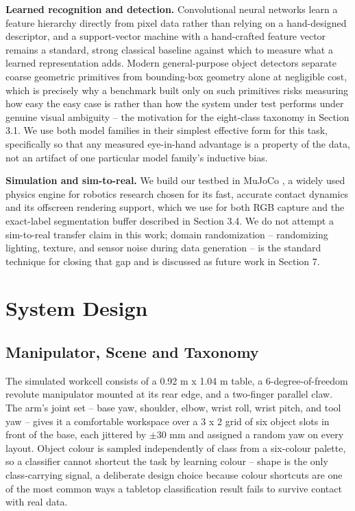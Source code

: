 \documentclass[conference]{IEEEtran}
\begin{document}
\textbf{Learned recognition and detection.} Convolutional neural networks \cite{lecun1998gradient} learn a feature hierarchy directly from pixel data rather than relying on a hand-designed descriptor, and a support-vector machine \cite{cortes1995support} with a hand-crafted feature vector remains a standard, strong classical baseline against which to measure what a learned representation adds. Modern general-purpose object detectors separate coarse geometric primitives from bounding-box geometry alone at negligible cost, which is precisely why a benchmark built only on such primitives risks measuring how easy the easy case is rather than how the system under test performs under genuine visual ambiguity -- the motivation for the eight-class taxonomy in Section 3.1. We use both model families in their simplest effective form for this task, specifically so that any measured eye-in-hand advantage is a property of the data, not an artifact of one particular model family's inductive bias.



\textbf{Simulation and sim-to-real.} We build our testbed in MuJoCo \cite{todorov2012mujoco}, a widely used physics engine for robotics research chosen for its fast, accurate contact dynamics and its offscreen rendering support, which we use for both RGB capture and the exact-label segmentation buffer described in Section 3.4. We do not attempt a sim-to-real transfer claim in this work; domain randomization \cite{tobin2017domain} -- randomizing lighting, texture, and sensor noise during data generation -- is the standard technique for closing that gap and is discussed as future work in Section 7.

\section{System Design}

\subsection{Manipulator, Scene and Taxonomy}

The simulated workcell consists of a 0.92 m x 1.04 m table, a 6-degree-of-freedom revolute manipulator mounted at its rear edge, and a two-finger parallel claw. The arm's joint set -- base yaw, shoulder, elbow, wrist roll, wrist pitch, and tool yaw -- gives it a comfortable workspace over a 3 x 2 grid of six object slots in front of the base, each jittered by $\pm$30 mm and assigned a random yaw on every layout. Object colour is sampled independently of class from a six-colour palette, so a classifier cannot shortcut the task by learning colour -- shape is the only class-carrying signal, a deliberate design choice because colour shortcuts are one of the most common ways a tabletop classification result fails to survive contact with real data.
\end{document}
